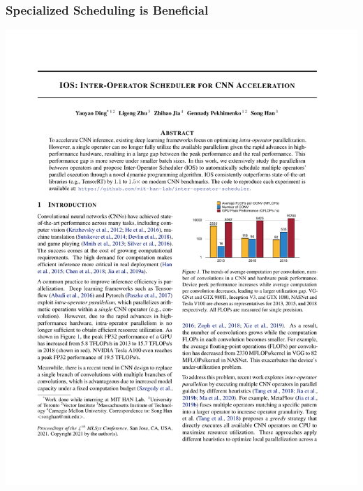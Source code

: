 \documentclass[12pt,aspectratio=169]{beamer}
\begin{document}
    \begin{frame}
        \frametitle{Specialized Scheduling is Beneficial}

        \begin{center}
            \includegraphics[page=9,trim=10.6cm 22.1cm 2.2cm 3cm,clip,scale=1.2]{paper.pdf}
        \end{center}
    \end{frame}
\end{document}

